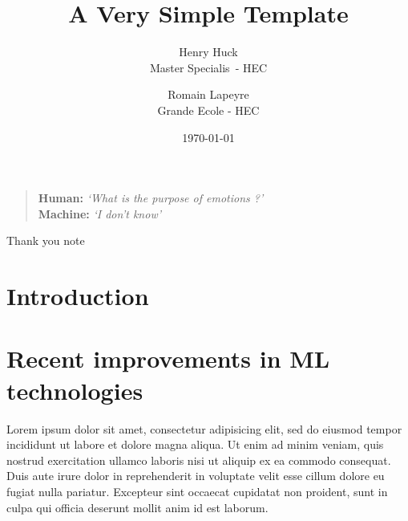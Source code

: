 \documentclass[11pt]{article}
\title{A Very Simple \LaTeXe{} Template}
\author{
        Henry Huck \\
        Master Specialis\ - HEC \\
        \and
        Romain Lapeyre\\
        Grande Ecole - HEC\\
}
\date{\today}
\begin{document}
\maketitle
\thispagestyle{empty}

\pagebreak


\phantom{TEXT}
\thispagestyle{empty}

\vspace{200pt}
\begin{quotation}
\noindent \textbf{Human:}  \textit{\lq What is the purpose of emotions ?\rq }\\
\textbf{Machine:} \textit{\lq I don't know\rq}
\end{quotation}

\pagebreak


\tableofcontents

\pagebreak

Thank you note

\pagebreak


\section{Introduction}\label{introduction}


\section{Recent improvements in ML technologies}

Lorem ipsum dolor sit amet, consectetur adipisicing elit, sed do eiusmod tempor incididunt ut labore et dolore magna aliqua. Ut enim ad minim veniam, quis nostrud exercitation ullamco laboris nisi ut aliquip ex ea commodo consequat. Duis aute irure dolor in reprehenderit in voluptate velit esse cillum dolore eu fugiat nulla pariatur. Excepteur sint occaecat cupidatat non proident, sunt in culpa qui officia deserunt mollit anim id est laborum.
\end{document}
